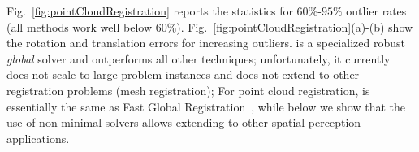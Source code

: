 Fig.~\ref{fig:pointCloudRegistration} reports the statistics for $60\%$-$95\%$ outlier rates (all methods work well below $60\%$). 
 Fig.~\ref{fig:pointCloudRegistration}(a)-(b) show the rotation and translation errors for increasing outliers. 
\TEASER is a specialized robust \emph{global} solver and outperforms all other techniques; 
 unfortunately, it currently does not scale to large problem instances and does not extend to other registration problems (\eg mesh registration); 
 For point cloud registration, \GNCGM is essentially the same as Fast Global Registration~\cite{Zhou16eccv-fastGlobalRegistration}, while below we show that the use of non-minimal solvers allows extending 
 \GNC to other spatial perception applications.

